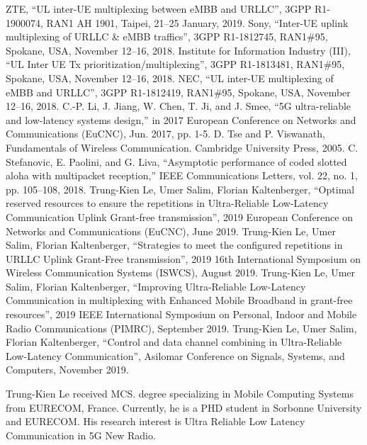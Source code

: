 \documentclass{ieeeaccess}
\begin{document}
\begin{thebibliography}{00}
 ZTE, ``UL inter-UE multiplexing between eMBB and URLLC'', 3GPP R1-1900074, RAN1 AH 1901, Taipei,  21--25 January, 2019.
  Sony, ``Inter-UE uplink multiplexing of URLLC \& eMBB traffics'', 3GPP R1-1812745, RAN1\#95, Spokane, USA, November 12--16, 2018.
  Institute for Information Industry (III), ``UL Inter UE Tx prioritization/multiplexing'', 3GPP R1-1813481, RAN1\#95, Spokane, USA, November 12--16, 2018.
  NEC, ``UL inter-UE multiplexing of eMBB and URLLC'', 3GPP R1-1812419, RAN1\#95, Spokane, USA, November 12--16, 2018.
  C.-P. Li, J. Jiang, W. Chen, T. Ji, and J. Smee, ``5G ultra-reliable and low-latency systems design,'' in 2017 European Conference on Networks and Communications (EuCNC), Jun. 2017, pp. 1-5. 
 D. Tse and P. Viswanath, Fundamentals of Wireless Communication. Cambridge University Press, 2005. 
 C. Stefanovic, E. Paolini, and G. Liva, ``Asymptotic performance of coded slotted aloha with multipacket reception,'' IEEE Communications Letters, vol. 22, no. 1, pp. 105--108, 2018.
 Trung-Kien Le, Umer Salim, Florian Kaltenberger, ``Optimal reserved resources to ensure the repetitions in Ultra-Reliable Low-Latency Communication Uplink Grant-free transmission'',  2019 European Conference on Networks and Communications (EuCNC), June 2019.
 Trung-Kien Le, Umer Salim, Florian Kaltenberger, ``Strategies to meet the configured repetitions in URLLC Uplink Grant-Free transmission'',  2019 16th International Symposium on Wireless Communication Systems (ISWCS), August 2019.
 Trung-Kien Le, Umer Salim, Florian Kaltenberger, ``Improving Ultra-Reliable Low-Latency Communication in multiplexing with Enhanced Mobile Broadband in grant-free resources'', 2019 IEEE International Symposium on Personal, Indoor and Mobile Radio Communications (PIMRC), September 2019.
 Trung-Kien Le, Umer Salim, Florian Kaltenberger, ``Control and data channel combining in Ultra-Reliable Low-Latency Communication'', Asilomar Conference on Signals, Systems, and Computers, November 2019.
\end{thebibliography}


\begin{IEEEbiography}{Trung-Kien Le} received MCS. degree specializing in Mobile Computing Systems from EURECOM, France. Currently, he is a PHD student in Sorbonne University and  EURECOM. His research interest is Ultra Reliable Low Latency Communication in 5G New Radio.
\end{IEEEbiography}
\end{document}
